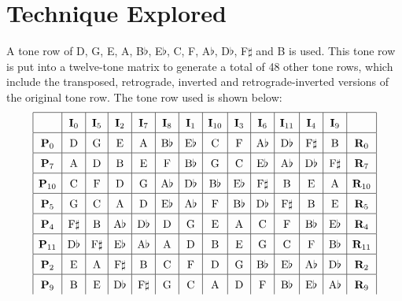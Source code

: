 \documentclass[a4paper]{article}
\begin{document}
\section{Technique Explored}

A tone row of D, G, E, A, B\(\flat\), E\(\flat\), C, F, A\(\flat\), D\(\flat\), F\(\sharp\) and B is used. This tone row is put into a twelve-tone matrix to generate a total of 48 other tone rows, which include the transposed, retrograde, inverted and retrograde-inverted versions of the original tone row. The tone row used is shown below:
\\
\[\def\arraystretch{1.5}
\begin{array}{|c|c|c|c|c|c|c|c|c|c|c|c|c|c|}
\hline
&\mathbf{I}_0&\mathbf{I}_5&\mathbf{I}_2&\mathbf{I}_7&\mathbf{I}_8&\mathbf{I}_1&\mathbf{I}_{10}&\mathbf{I}_3&\mathbf{I}_6&\mathbf{I}_{11}&\mathbf{I}_4&\mathbf{I}_9&\\
\hline
\mathbf{P}_0&\mathrm{D}&\mathrm{G}&\mathrm{E}&\mathrm{A}&\mathrm{B}\flat&\mathrm{E}\flat&\mathrm{C}&\mathrm{F}&\mathrm{A}\flat&\mathrm{D}\flat&\mathrm{F}\sharp&\mathrm{B}&\mathbf{R}_0\\
\hline
\mathbf{P}_7&\mathrm{A}&\mathrm{D}&\mathrm{B}&\mathrm{E}&\mathrm{F}&\mathrm{B}\flat&\mathrm{G}&\mathrm{C}&\mathrm{E}\flat&\mathrm{A}\flat&\mathrm{D}\flat&\mathrm{F}\sharp&\mathbf{R}_7\\
\hline
\mathbf{P}_{10}&\mathrm{C}&\mathrm{F}&\mathrm{D}&\mathrm{G}&\mathrm{A}\flat&\mathrm{D}\flat&\mathrm{B}\flat&\mathrm{E}\flat&\mathrm{F}\sharp&\mathrm{B}&\mathrm{E}&\mathrm{A}&\mathbf{R}_{10}\\
\hline
\mathbf{P}_5&\mathrm{G}&\mathrm{C}&\mathrm{A}&\mathrm{D}&\mathrm{E}\flat&\mathrm{A}\flat&\mathrm{F}&\mathrm{B}\flat&\mathrm{D}\flat&\mathrm{F}\sharp&\mathrm{B}&\mathrm{E}&\mathbf{R}_5\\
\hline
\mathbf{P}_4&\mathrm{F}\sharp&\mathrm{B}&\mathrm{A}\flat&\mathrm{D}\flat&\mathrm{D}&\mathrm{G}&\mathrm{E}&\mathrm{A}&\mathrm{C}&\mathrm{F}&\mathrm{B}\flat&\mathrm{E}\flat&\mathbf{R}_4\\
\hline
\mathbf{P}_{11}&\mathrm{D}\flat&\mathrm{F}\sharp&\mathrm{E}\flat&\mathrm{A}\flat&\mathrm{A}&\mathrm{D}&\mathrm{B}&\mathrm{E}&\mathrm{G}&\mathrm{C}&\mathrm{F}&\mathrm{B}\flat&\mathbf{R}_{11}\\
\hline
\mathbf{P}_2&\mathrm{E}&\mathrm{A}&\mathrm{F}\sharp&\mathrm{B}&\mathrm{C}&\mathrm{F}&\mathrm{D}&\mathrm{G}&\mathrm{B}\flat&\mathrm{E}\flat&\mathrm{A}\flat&\mathrm{D}\flat&\mathbf{R}_2\\
\hline
\mathbf{P}_9&\mathrm{B}&\mathrm{E}&\mathrm{D}\flat&\mathrm{F}\sharp&\mathrm{G}&\mathrm{C}&\mathrm{A}&\mathrm{D}&\mathrm{F}&\mathrm{B}\flat&\mathrm{E}\flat&\mathrm{A}\flat&\mathbf{R}_9\\

\end{array}\]
\end{document}
